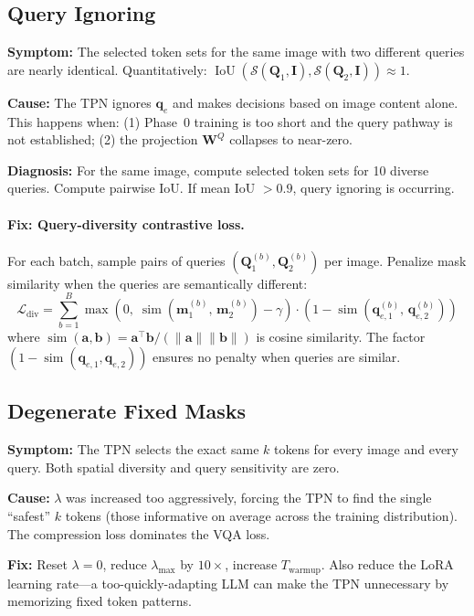 \documentclass[12pt,a4paper]{article}
\DeclareMathOperator{\IoU}{IoU}
\DeclareMathOperator{\simop}{sim}
\newcommand{\vq}{\mathbf{q}}     %
\newcommand{\vm}{\mathbf{m}}     %
\newcommand{\mI}{\mathbf{I}}     %
\newcommand{\mQ}{\mathbf{Q}}     %
\begin{document}
\subsection{Query Ignoring}

\begin{warnbox}[title={Failure Mode 2: Query Ignoring}]
\textbf{Symptom:} The selected token sets for the same image with two different
queries are nearly identical.
Quantitatively: $\IoU(\mathcal{S}(\mQ_1, \mI), \mathcal{S}(\mQ_2, \mI)) \approx 1$.

\textbf{Cause:} The TPN ignores $\vq_e$ and makes decisions based on image content
alone. This happens when: (1) Phase~0 training is too short and the query pathway
is not established; (2) the projection $\mathbf{W}^Q$ collapses to near-zero.

\textbf{Diagnosis:} For the same image, compute selected token sets for 10 diverse
queries. Compute pairwise IoU. If mean IoU $> 0.9$, query ignoring is occurring.
\end{warnbox}

\paragraph{Fix: Query-diversity contrastive loss.}
For each batch, sample pairs of queries $(\mQ_1^{(b)}, \mQ_2^{(b)})$ per image.
Penalize mask similarity when the queries are semantically different:
\begin{equation}
  \mathcal{L}_{\mathrm{div}} = \sum_{b=1}^B \max\!\left(
    0,\; \simop(\vm_1^{(b)},\, \vm_2^{(b)}) - \gamma
  \right) \cdot \left(1 - \simop(\vq_{e,1}^{(b)},\, \vq_{e,2}^{(b)})\right)
  \label{eq:div_loss}
\end{equation}
where $\simop(\mathbf{a}, \mathbf{b}) = \mathbf{a}^\top \mathbf{b} /
(\|\mathbf{a}\|\|\mathbf{b}\|)$ is cosine similarity. The factor
$(1 - \simop(\vq_{e,1}, \vq_{e,2}))$ ensures no penalty when queries are similar.

\subsection{Degenerate Fixed Masks}

\begin{warnbox}[title={Failure Mode 3: Degenerate Fixed Mask}]
\textbf{Symptom:} The TPN selects the exact same $k$ tokens for every image and
every query. Both spatial diversity and query sensitivity are zero.

\textbf{Cause:} $\lambda$ was increased too aggressively, forcing the TPN to
find the single ``safest'' $k$ tokens (those informative on average across the
training distribution). The compression loss dominates the VQA loss.

\textbf{Fix:} Reset $\lambda = 0$, reduce $\lambda_{\max}$ by $10\times$,
increase $T_{\mathrm{warmup}}$. Also reduce the LoRA learning rate---a
too-quickly-adapting LLM can make the TPN unnecessary by memorizing fixed
token patterns.
\end{warnbox}
\end{document}
